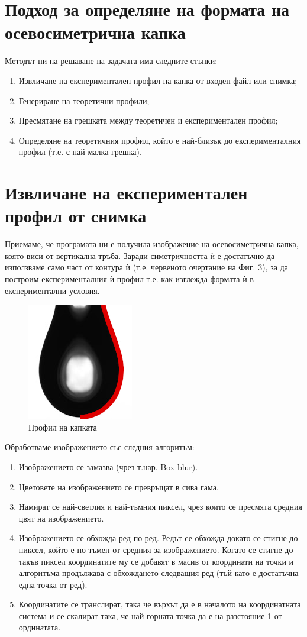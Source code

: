 \documentclass{article}
\begin{document}
\section{Подход за определяне на формата на осевосиметрична капка}
    Методът ни на решаване на задачата има следните стъпки:
    \renewcommand{\labelenumi}{\roman{enumi}}
    \begin{enumerate}
        \item Извличане на експериментален профил на капка от входен файл или снимка;
        \item Генериране на теоретични профили;
        \item Пресмятане на грешката между теоретичен и експериментален профил;
        \item Определяне на теоретичния профил, който е най-близък до експерименталния профил (т.е. с най-малка грешка).
    \end{enumerate}

\section{Извличане на експериментален профил от снимка}
    Приемаме, че програмата ни е получила изображение на осевосиметрична капка, която виси от вертикална тръба. Заради симетричността ѝ е достатъчно да използваме само част от контура ѝ (т.е. червеното очертание на Фиг. 3), за да построим експерименталния ѝ профил т.е. как изглежда формата ѝ в експериментални условия.\\
\begin{figure}[H]
\centering
\includegraphics[width=0.2\linewidth]{pendant_drop_1_with_profile.png}
\caption{Профил на капката}
\end{figure}

Обработваме изображението със следния алгоритъм:
    
\renewcommand{\labelenumi}{\roman{enumi}}
\begin{enumerate}
    \item Изображението се замазва (чрез т.нар. Box blur).
    \item Цветовете на изображението се превръщат в сива гама.
    \item Намират се най-светлия и най-тъмния пиксел, чрез които се пресмята средния цвят на изображението.
    \item Изображението се обхожда ред по ред. Редът се обхожда докато се стигне до пиксел, който е по-тъмен от средния за изображението. Когато се стигне до такъв пиксел координатите му се добавят в масив от координати на точки и алгоритъма продължава с обхождането следващия ред (тъй като е достатъчна една точка от ред).
    \item Координатите се транслират, така че върхът да е в началото на координатната система и се скалират така, че най-горната точка да е на разстояние 1 от ординатата.
\end{enumerate}
\end{document}
